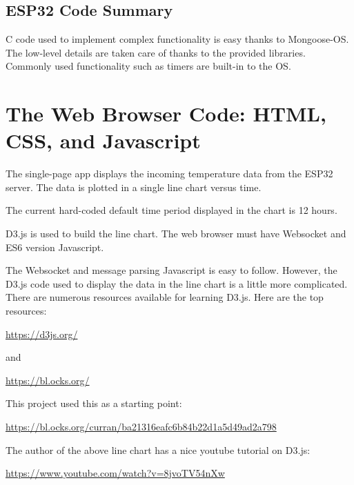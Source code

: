 \documentclass[letterpaper,]{book}
\begin{document}
\section{ESP32 Code Summary}\label{esp32-code-summary}

C code used to implement complex functionality is easy thanks to
Mongoose-OS. The low-level details are taken care of thanks to the
provided libraries. Commonly used functionality such as timers are
built-in to the OS.

\chapter{The Web Browser Code: HTML, CSS, and
Javascript}\label{the-web-browser-code-html-css-and-javascript}

The single-page app displays the incoming temperature data from the
ESP32 server. The data is plotted in a single line chart versus time.

The current hard-coded default time period displayed in the chart is 12
hours.

D3.js is used to build the line chart. The web browser must have
Websocket and ES6 version Javascript.

The Websocket and message parsing Javascript is easy to follow. However,
the D3.js code used to display the data in the line chart is a little
more complicated. There are numerous resources available for learning
D3.js. Here are the top resources:

\url{https://d3js.org/}

and

\url{https://bl.ocks.org/}

This project used this as a starting point:

\url{https://bl.ocks.org/curran/ba21316eafc6b84b22d1a5d49ad2a798}

The author of the above line chart has a nice youtube tutorial on D3.js:

\url{https://www.youtube.com/watch?v=8jvoTV54nXw}
\end{document}
